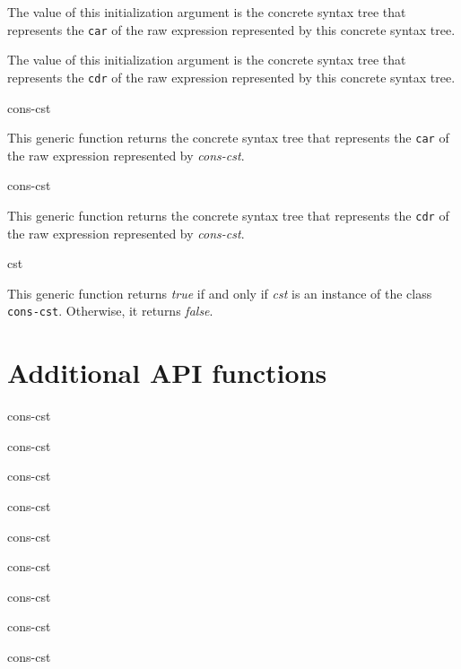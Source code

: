 The value of this initialization argument is the concrete syntax tree
that represents the \texttt{car} of the raw \commonlisp{} expression
represented by this concrete syntax tree.


The value of this initialization argument is the concrete syntax tree
that represents the \texttt{cdr} of the raw \commonlisp{} expression
represented by this concrete syntax tree.

 {cons-cst}

This generic function returns the concrete syntax tree that represents
the \texttt{car} of the raw \commonlisp{} expression represented by
\textit{cons-cst}.

 {cons-cst}

This generic function returns the concrete syntax tree that represents
the \texttt{cdr} of the raw \commonlisp{} expression represented by
\textit{cons-cst}.

 {cst}

This generic function returns \emph{true} if and only if \textit{cst}
is an instance of the class \texttt{cons-cst}.  Otherwise, it returns
\emph{false}.

\section{Additional API functions}

 {cons-cst}

 {cons-cst}

 {cons-cst}

 {cons-cst}

 {cons-cst}

 {cons-cst}

 {cons-cst}

 {cons-cst}

 {cons-cst}
